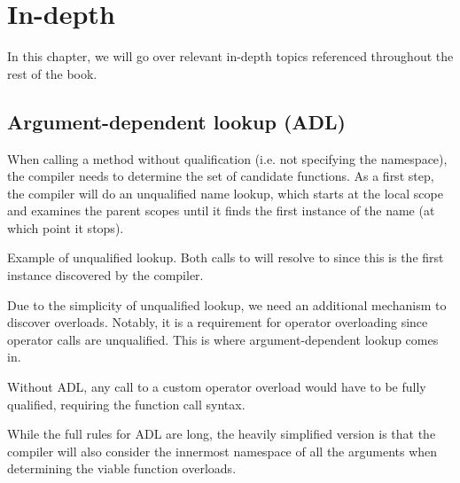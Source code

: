 \chapter{In-depth}

In this chapter, we will go over relevant in-depth topics referenced throughout the rest of the book.

\section{Argument-dependent lookup (ADL)}

When calling a method without qualification (i.e. not specifying the namespace), the compiler needs to determine the set of candidate functions. As a first step, the compiler will do an unqualified name lookup, which starts at the local scope and examines the parent scopes until it finds the first instance of the name (at which point it stops).

\begin{box-note}
\footnotesize Example of unqualified lookup. Both calls to  will resolve to  since this is the first instance discovered by the compiler.
\tcblower
{}
\end{box-note}

Due to the simplicity of unqualified lookup, we need an additional mechanism to discover overloads. Notably, it is a requirement for operator overloading since operator calls are unqualified. This is where argument-dependent lookup comes in.

\begin{box-note}
\footnotesize Without ADL, any call to a custom operator overload would have to be fully qualified, requiring the function call syntax.
\tcblower
{}
\end{box-note}

While the full rules for ADL are long, the heavily simplified version is that the compiler will also consider the innermost namespace of all the arguments when determining the viable function overloads.

\begin{box-note}
\footnotesize 
\tcblower
{}
\end{box-note}